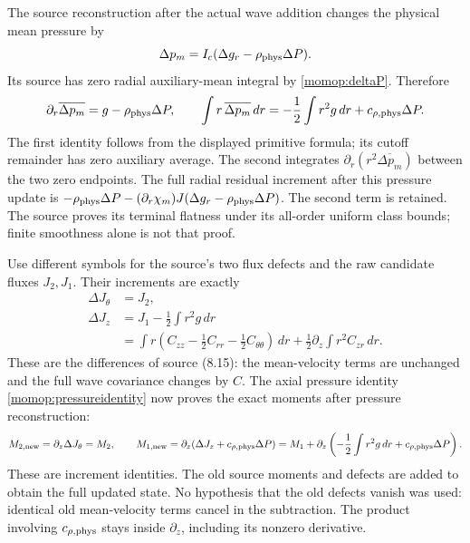 The source reconstruction after the actual wave addition changes the
physical mean pressure by
\[
 \Delta p_m=I_c(\Delta g_r-\rho_{\rm phys}\Delta P).
\]
Its source has zero radial auxiliary-mean integral by
\eqref{momop:deltaP}. Therefore
\begin{equation}\label{momop:pressureidentity}
 \partial_r\overline{\Delta p_m}
     =g-\rho_{\rm phys}\Delta P,\qquad
 \int r\,\overline{\Delta p_m}\,dr
     =-\frac12\int r^2g\,dr+c_{\rho,\rm phys}\Delta P .
\end{equation}
The first identity follows from the displayed primitive formula;
its cutoff remainder has zero auxiliary average. The second integrates
$\partial_r(r^2\overline{\Delta p_m})$ between the two zero endpoints.
The full radial residual increment after this pressure update is
$-\rho_{\rm phys}\Delta P-
(\partial_r\chi_m)J(\Delta g_r-\rho_{\rm phys}\Delta P)$.
The second term is retained. The source proves its terminal flatness
under its all-order uniform class bounds; finite smoothness alone is
not that proof.

Use different symbols for the source's two flux defects and the raw
candidate fluxes $J_2,J_1$. Their increments are exactly
\begin{align}
 \Delta J_\theta&=J_2,\nonumber\\
 \Delta J_z&=J_1-\frac12\int r^2g\,dr\nonumber\\
 &=\int r\left(C_{zz}-\frac12C_{rr}
                         -\frac12C_{\theta\theta}\right)\,dr
                    +\frac12\partial_z\int r^2C_{zr}\,dr .
 \label{momop:defectdictionary}
\end{align}
These are the differences of source (8.15): the mean-velocity terms
are unchanged and the full wave covariance changes by $C$.
The axial pressure identity \eqref{momop:pressureidentity} now proves
the exact moments after pressure reconstruction:
\begin{equation}\label{momop:afterpressure}
 M_{2,\rm new}=\partial_z\Delta J_\theta=M_2,\qquad
 M_{1,\rm new}=\partial_z(\Delta J_z+c_{\rho,\rm phys}\Delta P)
  =M_1+\partial_z\left(-\frac12\int r^2g\,dr
                                      +c_{\rho,\rm phys}\Delta P\right).
\end{equation}
These are increment identities. The old source moments and defects
are added to obtain the full updated state. No hypothesis that the
old defects vanish was used: identical old mean-velocity terms
cancel in the subtraction. The product involving $c_{\rho,\rm phys}$
stays inside $\partial_z$, including its nonzero derivative.

